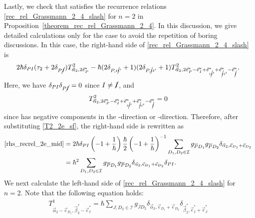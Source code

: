 \documentclass[pdftex]{sigma}
\numberwithin{equation}{section}
\begin{document}
Lastly, we check that
 satisfies the recurrence relations \eqref{rec_rel_Grassmann_2_4_slash} for $n=2$ in
Proposition~\ref{theorem_rec_rel_Grassmann_2_4}. In this discussion, we give
detailed calculations
only for the case
to avoid the repetition of boring discussions. In this case, the right-hand side of \eqref{rec_rel_Grassmann_2_4_slash} is
\begin{align}
2
\hbar
\delta_{PI}
 (
\tau_{2}
+
2
\delta_{P\cancel{I}}
 )
T^{2}_{\vec{\alpha}_{2},
2
\vec{e}_{P}^{\ast}
}
-
\hbar
 (
2
\delta_{P,i\cancel{i}'}
+
1
 )
 (
2
\delta_{P,\cancel{i}i'}
+
1
 )
T^{2}_{\vec{\alpha}_{2},
2
\vec{e}_{P}^{\ast}
-
\vec{e}_{I}^{\ast}
+
\vec{e}_{i\cancel{i}'}^{\ast}
+
\vec{e}_{\cancel{i}i'}^{\ast}
-
\vec{e}_{\cancel{I}}^{\ast}
}
.
\label{rhs_recrel_2e_mid}
\end{align}
Here,
we have
$
\delta_{PI}
\delta_{P\cancel{I}}
=
0
$
since
$
I
\neq
\cancel{I}
$,
and
\[
T^{2}_{\vec{\alpha}_{2},
2
\vec{e}_{P}^{\ast}
-
\vec{e}_{I}^{\ast}
+
\vec{e}_{i\cancel{i}'}^{\ast}
+
\vec{e}_{\cancel{i}i'}^{\ast}
-
\vec{e}_{\cancel{I}}^{\ast}
}
=
0
\]
since
has negative components
in the -direction or -direction.
Therefore, after substituting \eqref{T2_2e_sf}, the right-hand side is rewritten as
\begin{align}
\eqref{rhs_recrel_2e_mid}
={}&
2
\hbar
\delta_{PI}
 \left(
-1
+
\frac{1}{\hbar}
 \right)
\frac{\hbar}{2}
 \left(
-1
+
\frac{1}{\hbar}
 \right)^{-1}
\sum_{
D_{1},D_{2}
\in
\mathcal{I}
}
g_{\overline{P}D_{1}}
g_{\overline{P}D_{2}}
\delta_{
\vec{\alpha}_{2},
\vec{e}_{D_{1}}
+
\vec{e}_{D_{2}}
}
\nonumber
\\
={}&
\hbar^{2}
\sum_{
D_{1},D_{2}
\in
\mathcal{I}
}
g_{\overline{P}D_{1}}
g_{\overline{P}D_{2}}
\delta_{
\vec{\alpha}_{2},
\vec{e}_{D_{1}}
+
\vec{e}_{D_{2}}
}
\delta_{PI}
.
\label{rhs_recrel_2e}
\end{align}
We next calculate the left-hand side of \eqref{rec_rel_Grassmann_2_4_slash} for $n=2$. Note that the following equation holds:
\begin{align*}
T^{1}_{
\vec{\alpha}_{2}
-
\vec{e}_{D_{1}}
,
\vec{\beta}_{2}^{\ast}
-
\vec{e}_{I}^{\ast}
}
=
\hbar
\sum_{
J,D_{2}
\in
\mathcal{I}
}
g_{\overline{J}D_{2}}
\delta_{
\vec{\alpha}_{2},
\vec{e}_{D_{1}}
+
\vec{e}_{D_{2}}
}
\delta_{
\vec{\beta}_{2}^{\ast},
\vec{e}_{I}^{\ast}
+
\vec{e}_{J}^{\ast}
}
\end{align*}
\end{document}
